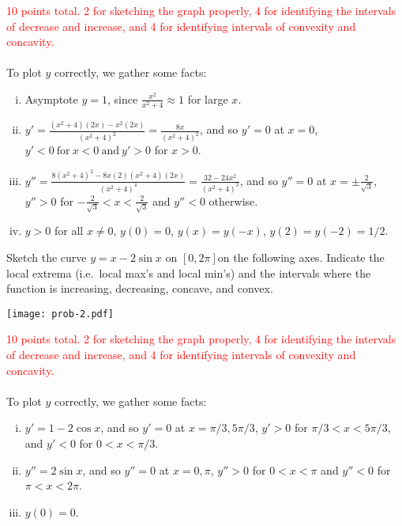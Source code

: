 \documentclass[12pt]{article}
\begin{document}
\noindent
\textcolor{red}{\Large 10 points total. 2 for sketching the graph properly, 4 for identifying the intervals of decrease and increase, and 4 for
        identifying intervals of convexity and concavity.}
\\
\\
To plot $y$ correctly, we gather some facts:
\begin{enumerate}[i)]
\item{} Asymptote $y=1$, since $\displaystyle \frac{x^{2}}{x^{2} + 4} \approx 1$ for large $x$. 
\item{}
    $ \displaystyle y'
    = \frac{(x^{2} + 4)(2x) - x^{2}(2x)}{(x^{2} + 4)^{2}}
    = \frac{8x}{(x^{2} + 4)^{2}}$, and so
    $ \displaystyle y' =0$ at $x = 0$, $y' < 0 \ \text{for} \  x  < 0 \
    \text{and} \ y' > 0$ for $x > 0$.
    \item{}
      $\displaystyle y'' = \frac{8(x^{2} + 4)^{2} - 8x(2)(x^{2} +
    4)(2x)}{(x^{2} + 4)^{4}} = \frac{32 - 24x^{2}}{(x^{2} + 4)^{3}}$, and so
    $y'' = 0$ at $\displaystyle x = \pm \frac{2}{\sqrt{3}}$, $y'' > 0$ for
    $ \displaystyle
    -\frac{2}{\sqrt{3}} < x < \frac{2}{\sqrt{3}}$ and $y'' <0$ otherwise. 
  \item{}
    $y>0$ for all $x \neq 0$, $y(0) = 0$, $y(x) = y(-x)$, $y(2) = y(-2) = 1/2$.
\end{enumerate}
\newpage
\noindent
{} Sketch the curve $\displaystyle y=x - 2\sin x$ on $[0, 2\pi]$on the following axes. Indicate the local extrema (i.e.\ local max's and
local min's) and the intervals where the function is
increasing, decreasing, concave, and convex. 
\vspace{-16em}
\begin{center}
    \texttt{[image: prob-2.pdf]}
\end{center}
\vspace{-16em}
\textcolor{red}{\Large 10 points total. 2 for sketching the graph properly, 4 for identifying the intervals of decrease and increase, and 4 for
        identifying intervals of convexity and concavity.}
\\
\\
To plot $y$ correctly, we gather some facts:
\begin{enumerate}[i)]
\item{}
        $ \displaystyle y' = 1 - 2 \cos x$, and so
        $\displaystyle y'=0$ at $x = \pi/3, 5\pi/3$, $y' > 0$ for $\pi/3< x < 5\pi/3$, and $y' < 0$ for $0 < x < \pi/3$. 
        \item{}
        $y'' = 2 \sin x$, and so $y''= 0$ at $x = 0, \pi$, $y'' > 0$ for $0 < x < \pi$ and $y'' < 0$ for $\pi < x < 2 \pi$.
        \item{}
        $y(0) = 0$.
\end{enumerate}
\end{document}

